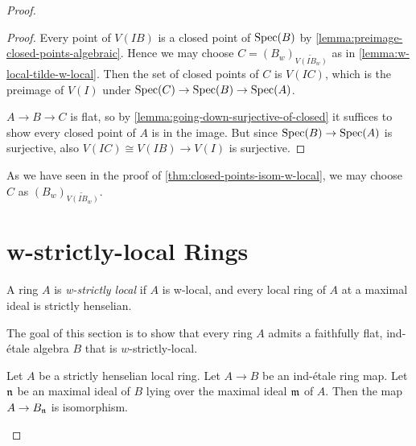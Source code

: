 \begin{proof}
\begin{proof}
    Every point of $V(IB)$ is a closed point of $\mathrm{Spec}(B)$ by \ref{lemma:preimage-closed-points-algebraic}.
    Hence we may choose $C = (B_w)_{\widetilde{V(IB_w)}}$ as in \ref{lemma:w-local-tilde-w-local}. Then
    the set of closed points of $C$ is $V(IC)$, which is the preimage of $V(I)$ under
    $\mathrm{Spec}(C) \to \mathrm{Spec}(B) \to \mathrm{Spec}(A)$.

    $A \to B \to C$ is flat, so by \ref{lemma:going-down-surjective-of-closed} it suffices
    to show every closed point of $A$ is in the image. But since $\mathrm{Spec}(B) \to \mathrm{Spec}(A)$ is surjective,
    also $V(IC) \cong V(IB) \to V(I)$ is surjective.
\end{proof}

\begin{remark}
    As we have seen in the proof of \ref{thm:closed-points-isom-w-local}, we may choose
    $C$ as $(B_w)_{\widetilde{V(IB_w)}}$.
\end{remark}

\section{w-strictly-local Rings}

\begin{definition}
    A ring \(A\) is \emph{w-strictly local} if \(A\) is w-local, and every local ring of \(A\) at a maximal ideal is strictly henselian.
    \label{def:w-strictly-local-ring}
\end{definition}

The goal of this section is to show that every ring $A$ admits a faithfully flat, ind-étale algebra $B$ that is $w$-strictly-local.

\begin{lemma}
  \label{thm:ind-etale-strictly-henselian-localization-isom}
  Let \(A\) be a strictly henselian local ring. Let \(A \to B\) be an ind-étale ring map. Let ${\mathfrak{n}}$ be an maximal ideal of $B$ lying over the maximal ideal ${\mathfrak{m}}$ of $A$. Then the map $A \to B_{\mathfrak{n}}$ is isomorphism.
\end{lemma}


\end{proof}
